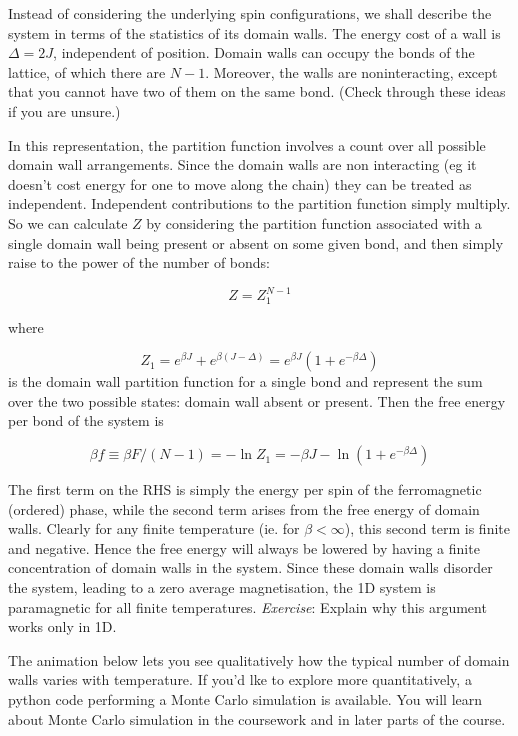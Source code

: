 \documentclass[
  letterpaper,
  DIV=11,
  numbers=noendperiod]{scrreprt}
\begin{document}
Instead of considering the underlying spin configurations, we shall
describe the system in terms of the statistics of its domain walls. The
energy cost of a wall is \(\Delta = 2J\), independent of position.
Domain walls can occupy the bonds of the lattice, of which there are
\(N-1\). Moreover, the walls are noninteracting, except that you cannot
have two of them on the same bond. (Check through these ideas if you are
unsure.)

In this representation, the partition function involves a count over all
possible domain wall arrangements. Since the domain walls are non
interacting (eg it doesn't cost energy for one to move along the chain)
they can be treated as independent. Independent contributions to the
partition function simply multiply. So we can calculate \(Z\) by
considering the partition function associated with a single domain wall
being present or absent on some given bond, and then simply raise to the
power of the number of bonds:

\[Z=Z_1^{N-1}\]

where

\[Z_1=e^{\beta J} + e^{\beta (J-\Delta)}=e^{\beta J}(1+e^{-\beta\Delta})\]
is the domain wall partition function for a single bond and represent
the sum over the two possible states: domain wall absent or present.
Then the free energy per bond of the system is

\[\beta f\equiv \beta F/(N-1)=-\ln Z_1=-\beta J-\ln(1+e^{-\beta\Delta})\]

The first term on the RHS is simply the energy per spin of the
ferromagnetic (ordered) phase, while the second term arises from the
free energy of domain walls. Clearly for any finite temperature (ie. for
\(\beta<\infty\)), this second term is finite and negative. Hence the
free energy will always be lowered by having a finite concentration of
domain walls in the system. Since these domain walls disorder the
system, leading to a zero average magnetisation, the 1D system is
paramagnetic for all finite temperatures. \emph{Exercise}: Explain why
this argument works only in 1D.

The animation below lets you see qualitatively how the typical number of
domain walls varies with temperature. If you'd lke to explore more
quantitatively, a python code performing a Monte Carlo simulation is
available. You will learn about Monte Carlo simulation in the coursework
and in later parts of the course.
\end{document}
